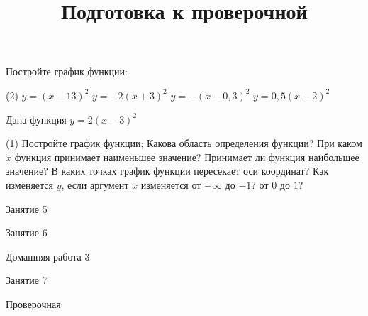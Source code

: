 \begin{homework}[number=2]
	\begin{listofex}
		\item Постройте график функции:
		\begin{tasks}(2)
			\task \( y=(x-13)^2 \)
			\task \( y=-2(x+3)^2 \)
			\task \( y=-(x-0,3)^2 \)
			\task \( y=0,5(x+2)^2 \)
		\end{tasks}
		\item Дана функция \( y=2(x-3)^2 \)
		\begin{tasks}(1)
			\task Постройте график функции;
			\task Какова область определения функции?
			\task При каком \( x \) функция принимает наименьшее значение? Принимает ли функция наибольшее значение?
			\task В каких точках график функции пересекает оси координат?
			\task Как изменяется \( y \), если аргумент \( x \) изменяется от \( -\infty  \) до \( -1 \)? от \( 0 \) до \( 1 \)?
		\end{tasks}
	\end{listofex}
\end{homework}

\begin{class}[number=5]
	\begin{listofex}
		\item Занятие 5
	\end{listofex}
\end{class}

\begin{class}[number=6]
	\begin{listofex}
		\item Занятие 6
	\end{listofex}
\end{class}

\begin{homework}[number=3]
	\begin{listofex}
		\item Домашняя работа 3
	\end{listofex}
\end{homework}

\begin{class}[number=7]
	\title{Подготовка к проверочной}
	\begin{listofex}
		\item Занятие 7
	\end{listofex}
\end{class}

\begin{exam}
	\begin{listofex}
		\item Проверочная
	\end{listofex}
\end{exam}
